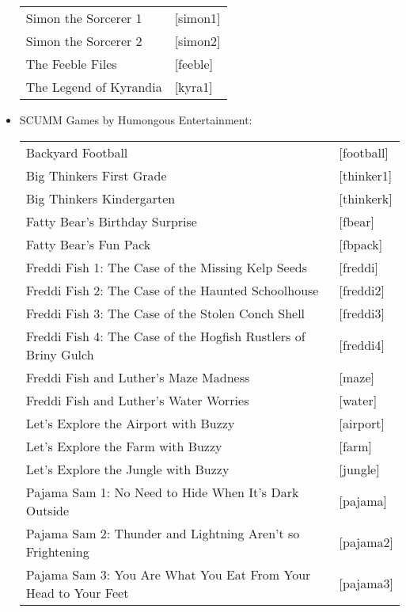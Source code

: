 \begin{itemize}
\begin{tabular}[h]{ll}
    Simon the Sorcerer 1&                          [simon1]\\
    Simon the Sorcerer 2&                          [simon2]\\
    The Feeble Files&                              [feeble]\\
    The Legend of Kyrandia&                        [kyra1]\\
  \end{tabular}
\item SCUMM Games by Humongous Entertainment:\\
  \begin{tabular}[h]{ll}
    Backyard Football&                             [football]\\
    Big Thinkers First Grade&                      [thinker1]\\
    Big Thinkers Kindergarten&                     [thinkerk]\\
    Fatty Bear's Birthday Surprise&                [fbear]\\
    Fatty Bear's Fun Pack&                         [fbpack]\\
    Freddi Fish 1: The Case of the Missing
        Kelp Seeds&                                [freddi]\\
    Freddi Fish 2: The Case of the Haunted
        Schoolhouse&                               [freddi2]\\
    Freddi Fish 3: The Case of the Stolen
        Conch Shell&                               [freddi3]\\
    Freddi Fish 4: The Case of the Hogfish
        Rustlers of Briny Gulch&                   [freddi4]\\
    Freddi Fish and Luther's Maze Madness&         [maze]\\
    Freddi Fish and Luther's Water Worries&        [water]\\
    Let's Explore the Airport with Buzzy&          [airport]\\
    Let's Explore the Farm with Buzzy&             [farm]\\
    Let's Explore the Jungle with Buzzy&           [jungle]\\
    Pajama Sam 1: No Need to Hide When It's
        Dark Outside&                              [pajama]\\
    Pajama Sam 2: Thunder and Lightning
        Aren't so Frightening&                     [pajama2]\\
    Pajama Sam 3: You Are What You Eat
        From Your Head to Your Feet&               [pajama3]\\

\end{tabular}
\end{itemize}
